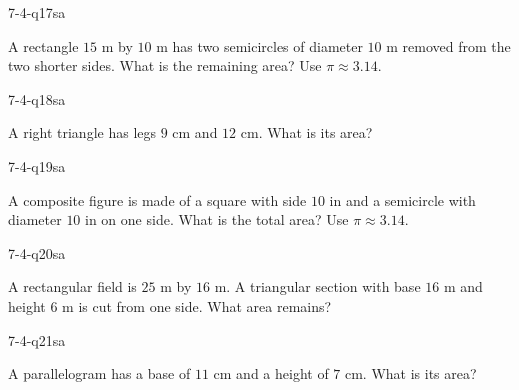 \begin{practiceQuestion}{7-4-q17}{sa}
\begin{questionText}
A rectangle $15$ m by $10$ m has two semicircles of diameter $10$ m removed from the two shorter sides. What is the remaining area? Use $\pi \approx 3.14$.
\end{questionText}
\end{practiceQuestion}

\begin{practiceQuestion}{7-4-q18}{sa}
\begin{questionText}
A right triangle has legs $9$ cm and $12$ cm. What is its area?
\end{questionText}
\end{practiceQuestion}

\begin{practiceQuestion}{7-4-q19}{sa}
\begin{questionText}
A composite figure is made of a square with side $10$ in and a semicircle with diameter $10$ in on one side. What is the total area? Use $\pi \approx 3.14$.
\end{questionText}
\end{practiceQuestion}

\begin{practiceQuestion}{7-4-q20}{sa}
\begin{questionText}
A rectangular field is $25$ m by $16$ m. A triangular section with base $16$ m and height $6$ m is cut from one side. What area remains?
\end{questionText}
\end{practiceQuestion}

\begin{practiceQuestion}{7-4-q21}{sa}
\begin{questionText}
A parallelogram has a base of $11$ cm and a height of $7$ cm. What is its area?
\end{questionText}
\end{practiceQuestion}

